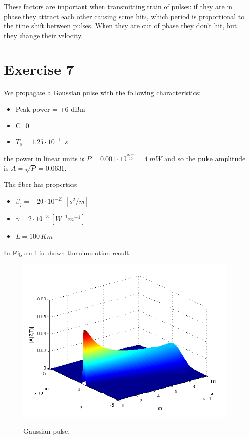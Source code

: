 \documentclass[a4paper,10pt]{report}
\begin{document}
These factors are important when transmitting train of pulses: if they are in phase they attract each other causing some hits,
which period is proportional to the time shift between pulses.
When they are out of phase they don't hit, but they change their velocity.

\newpage
\section*{Exercise 7}
We propagate a Gaussian pulse with the following characteristics:
\begin{itemize}
 \item Peak power = +6 dBm
 \item C=0
 \item $T_0=1.25 \cdot 10^{-11} \ s$
\end{itemize}
the power in linear units is $P=0.001 \cdot 10^{\frac{dBm}{10}}=4 \ mW$ and so the pulse amplitude is $A=\sqrt{P}=0.0631$.

The fiber has properties:
\begin{itemize}
 \item $\beta_2 = -20 \cdot 10^{-27} \ [s^2/m]$
 \item $\gamma = 2 \cdot 10^{-3} \ [W^{-1} m^{-1}]$
 \item $L=100 \ Km$
\end{itemize}

In Figure \ref{es7_1} is shown the simulation result.
\begin{figure}[!ht]
  \centering
  \includegraphics[width=11cm]{es7_1.png}\\
  \caption{Gaussian pulse.}
  \label{es7_1}
\end{figure}
\end{document}
